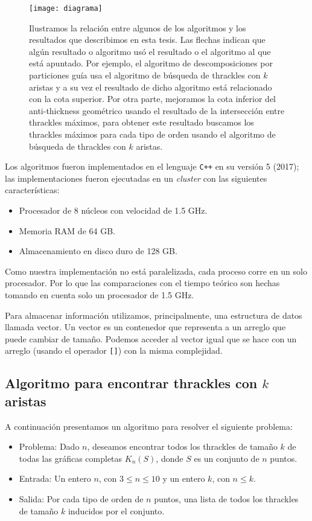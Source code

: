   \begin{figure}
    \centering
    \texttt{[image: diagrama]}
    \caption{Ilustramos la relación entre algunos de los algoritmos y los resultados que describimos en esta tesis. Las flechas indican que algún resultado o algoritmo usó el resultado o el algoritmo al que está apuntado. Por ejemplo, el algoritmo de descomposiciones por particiones guía usa el algoritmo de búsqueda de thrackles con $k$ aristas y a su vez el resultado de dicho algoritmo está relacionado con la cota superior. Por otra parte, mejoramos la cota inferior del anti-thickness geométrico usando el resultado de la intersección entre thrackles máximos, para obtener este resultado buscamos los thrackles máximos para cada tipo de orden usando el algoritmo de búsqueda de thrackles con $k$ aristas.}
    \label{fig:diagrama}
  \end{figure}
  Los algoritmos fueron implementados en el lenguaje \texttt{C++} en su versión 5 (2017);
  las implementaciones fueron ejecutadas en un \emph{cluster} con las siguientes características:
  \begin{itemize}
    \item Procesador de 8 núcleos con velocidad de 1.5 GHz.
    \item Memoria RAM de 64 GB.
    \item Almacenamiento en disco duro de 128 GB.
  \end{itemize}
  Como nuestra implementación no está paralelizada, cada proceso corre en un solo procesador. Por lo que las comparaciones con el tiempo teórico son hechas tomando en cuenta solo un procesador de 1.5 GHz.

  Para almacenar información utilizamos, principalmente, una estructura de datos llamada vector. Un vector es un contenedor que representa a un arreglo que puede cambiar de tamaño. Podemos acceder al vector igual que se hace con un arreglo (usando el operador \texttt{[]}) con la misma complejidad.

\subsection{Algoritmo para encontrar thrackles con $k$
  aristas}\label{seccion_algoritmo_kthrackles}
  A continuación presentamos un algoritmo para resolver el siguiente problema:
  \begin{itemize}
    \item[] Problema: Dado $n$, deseamos encontrar todos los thrackles de tamaño $k$ de todas las gráficas completas $K_n(S)$, donde $S$ es un conjunto de $n$ puntos.
    \item[] Entrada: Un entero $n$, con $ 3 \leq n \leq 10$ y un entero $k$, con $ n \leq
    k$.
    \item[] Salida: Por cada tipo de orden de $n$ puntos, una lista de todos los thrackles de tamaño $k$ inducidos por el conjunto.
  \end{itemize}

